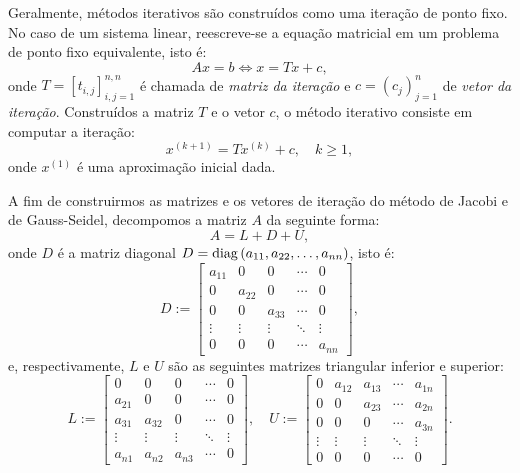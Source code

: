 Geralmente, métodos iterativos são construídos como uma iteração de ponto fixo. No caso de um sistema linear, reescreve-se a equação matricial em um problema de ponto fixo equivalente, isto é:
\begin{equation}
  Ax = b \Leftrightarrow x = Tx + c,
\end{equation}
onde $T = [t_{i,j}]_{i,j=1}^{n,n}$ é chamada de \emph{matriz da iteração} e $c = (c_j)_{j=1}^n$ de \emph{vetor da iteração}. Construídos a matriz $T$ e o vetor $c$, o método iterativo consiste em computar a iteração:
\begin{equation}
  x^{(k+1)} = Tx^{(k)} + c,\quad k\geq 1,
\end{equation}
onde $x^{(1)}$ é uma aproximação inicial dada.

A fim de construirmos as matrizes e os vetores de iteração do método de Jacobi e de Gauss-Seidel, decompomos a matriz $A$ da seguinte forma:
\begin{equation}
  A = L + D + U,
\end{equation}
onde $D$ é a matriz diagonal $D = \operatorname{diag}\,(a_{11}, a_{22}, \ldots, a_{nn})$, isto é:
\begin{equation}
  D := \begin{bmatrix}
    a_{11} & 0 & 0 & \cdots & 0\\
    0 & a_{22} & 0 & \cdots & 0\\
    0 & 0 & a_{33} & \cdots & 0\\
    \vdots & \vdots & \vdots & \ddots & \vdots\\
    0 & 0 & 0 & \cdots & a_{nn}
  \end{bmatrix},
\end{equation}
e, respectivamente, $L$ e $U$ são as seguintes matrizes triangular inferior e superior:
\begin{equation}
  L := \begin{bmatrix}
    0 & 0 & 0 & \cdots & 0\\
    a_{21} & 0 & 0 & \cdots & 0\\
    a_{31} & a_{32} & 0 &\cdots & 0\\
    \vdots & \vdots & \vdots & \ddots & \vdots\\
    a_{n1} & a_{n2} & a_{n3} & \cdots & 0
  \end{bmatrix},\quad
  U := \begin{bmatrix}
    0 & a_{12} & a_{13} & \cdots & a_{1n}\\
    0 & 0 & a_{23} & \cdots & a_{2n}\\
    0 & 0 & 0 & \cdots & a_{3n}\\
    \vdots & \vdots & \vdots & \ddots & \vdots\\
    0 & 0 & 0 & \cdots & 0
  \end{bmatrix}.
\end{equation}

